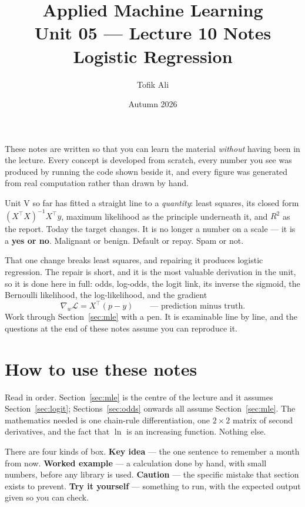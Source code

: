 \documentclass[11pt]{article}
\title{Applied Machine Learning\\Unit 05 --- Lecture 10 Notes\\
       Logistic Regression}
\author{Tofik Ali}
\date{Autumn 2026}
\begin{document}
\maketitle

\begin{keyidea}
These notes are written so that you can learn the material \emph{without}
having been in the lecture. Every concept is developed from scratch, every
number you see was produced by running the code shown beside it, and every
figure was generated from real computation rather than drawn by hand.

Unit V so far has fitted a straight line to a \emph{quantity}: least squares,
its closed form $(X^{\!\top}X)^{-1}X^{\!\top}y$, maximum likelihood as the
principle underneath it, and $R^2$ as the report. Today the target changes.
It is no longer a number on a scale --- it is a \textbf{yes or no}. Malignant
or benign. Default or repay. Spam or not.

That one change breaks least squares, and repairing it produces logistic
regression. The repair is short, and it is the most valuable derivation in
the unit, so it is done here in full: odds, log-odds, the logit link, its
inverse the sigmoid, the Bernoulli likelihood, the log-likelihood, and the
gradient
\[
  \nabla_w \mathcal{L} = X^{\!\top}(p - y) \qquad\text{--- prediction minus truth.}
\]
Work through Section~\ref{sec:mle} with a pen. It is examinable line by line,
and the questions at the end of these notes assume you can reproduce it.
\end{keyidea}

\tableofcontents
\medskip

\section{How to use these notes}
\label{sec:how}

Read in order. Section~\ref{sec:mle} is the centre of the lecture and it
assumes Section~\ref{sec:logit}; Sections~\ref{sec:odds} onwards all assume
Section~\ref{sec:mle}. The mathematics needed is one chain-rule
differentiation, one $2\times2$ matrix of second derivatives, and the fact
that $\ln$ is an increasing function. Nothing else.

There are four kinds of box. \textbf{Key idea} --- the one sentence to
remember a month from now. \textbf{Worked example} --- a calculation done by
hand, with small numbers, before any library is used. \textbf{Caution} --- the
specific mistake that section exists to prevent. \textbf{Try it yourself} ---
something to run, with the expected output given so you can check.
\end{document}
